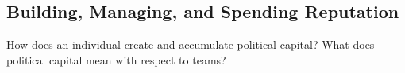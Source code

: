 \subsection{Building, Managing, and Spending Reputation}

How does an individual create and accumulate political capital? What does political capital mean with respect to teams?

